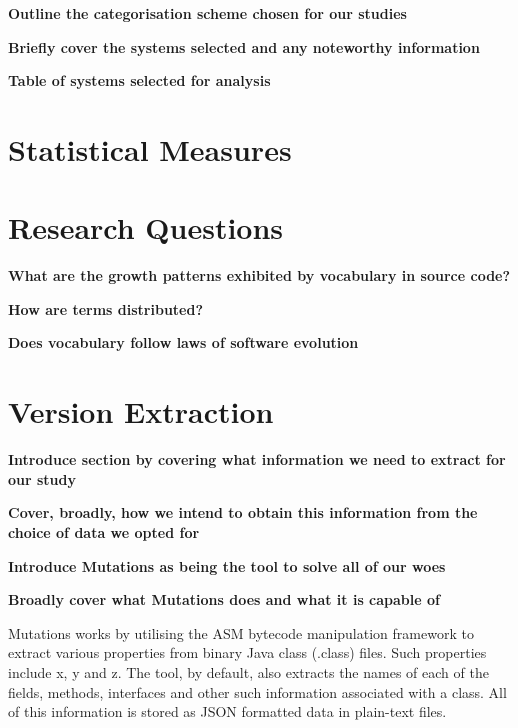 \textbf{Outline the categorisation scheme chosen for our studies}

\textbf{Briefly cover the systems selected and any noteworthy information}

\textbf{Table of systems selected for analysis}



\section{Statistical Measures} %
\label{sec:statistical_measures}

% 


\section{Research Questions} %
\label{sec:research_questions}

\textbf{What are the growth patterns exhibited by vocabulary in source code?}

\textbf{How are terms distributed?}

\textbf{Does vocabulary follow laws of software evolution}


\section{Version Extraction} %
\label{sec:version_extraction}

\textbf{Introduce section by covering what information we need to extract for our study}

\textbf{Cover, broadly, how we intend to obtain this information from the choice of data we opted for}

\textbf{Introduce Mutations as being the tool to solve all of our woes}

\textbf{Broadly cover what Mutations does and what it is capable of}

Mutations works by utilising the ASM bytecode manipulation framework to extract various properties from binary Java class (.class) files. Such properties include x, y and z. The tool, by default, also extracts the names of each of the fields, methods, interfaces and other such information associated with a class. All of this information is stored as JSON formatted data in plain-text files.

